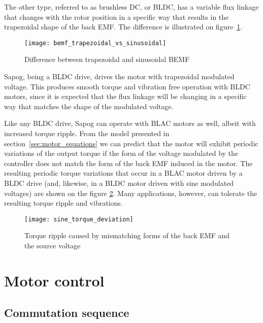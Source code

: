 \documentclass{zubaxdoc}
\begin{document}
	The other type, referred to as brushless DC, or BLDC, has a variable flux linkage that changes with the
	rotor position in a specific way that results in the trapezoidal shape of the back EMF.
	The difference is illustrated on figure~\ref{bemf_trapezoidal_vs_sinusoidal}.
	
	\begin{figure}[hbt]
		\centering
		\texttt{[image: bemf\_trapezoidal\_vs\_sinusoidal]}
		\caption{Difference between trapezoidal and sinusoidal BEMF
			\label{bemf_trapezoidal_vs_sinusoidal}}
	\end{figure}
	
	Sapog, being a BLDC drive, drives the motor with trapezoidal modulated voltage.
	This produces smooth torque and vibration free operation with BLDC motors,
	since it is expected that the flux linkage will be changing in a specific way
	that matches the shape of the modulated voltage.
	
	Like any BLDC drive, Sapog can operate with BLAC motors as well, albeit with increased torque ripple.
	From the model presented in section~\ref{sec:motor_equations} we can predict that the motor
	will exhibit periodic variations of the output torque if the form of the voltage modulated by the controller
	does not match the form of the back EMF induced in the motor.
	The resulting periodic torque variations that occur in a BLAC motor driven by a BLDC drive
	(and, likewise, in a BLDC motor driven with sine modulated voltages) are shown on the figure
	\ref{sine_torque_deviation}.
	Many applications, however, can tolerate the resulting torque ripple and vibrations.
	
	\begin{figure}[hbt]
		\centering
		\texttt{[image: sine\_torque\_deviation]}
		\caption{Torque ripple caused by mismatching forms of the back EMF and the source voltage
			\label{sine_torque_deviation}}
	\end{figure}
	
	\section{Motor control}
	
	\subsection{Commutation sequence}
	
	\newcommand{\BEMFH}{$\uparrow$}
	\newcommand{\BEMFL}{$\downarrow$}
	
\end{document}
